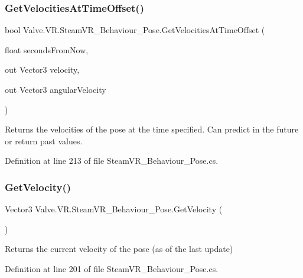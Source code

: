 \subsubsection{\texorpdfstring{GetVelocitiesAtTimeOffset()}{GetVelocitiesAtTimeOffset()}}
{\footnotesize\ttfamily bool Valve.\+V\+R.\+Steam\+V\+R\+\_\+\+Behaviour\+\_\+\+Pose.\+Get\+Velocities\+At\+Time\+Offset (\begin{DoxyParamCaption}\item[{float}]{seconds\+From\+Now,  }\item[{out Vector3}]{velocity,  }\item[{out Vector3}]{angular\+Velocity }\end{DoxyParamCaption})}



Returns the velocities of the pose at the time specified. Can predict in the future or return past values. 



Definition at line 213 of file Steam\+V\+R\+\_\+\+Behaviour\+\_\+\+Pose.\+cs.

\mbox{\label{class_valve_1_1_v_r_1_1_steam_v_r___behaviour___pose_ac36bf2a333805b149722844bf2994256}} 
\subsubsection{\texorpdfstring{GetVelocity()}{GetVelocity()}}
{\footnotesize\ttfamily Vector3 Valve.\+V\+R.\+Steam\+V\+R\+\_\+\+Behaviour\+\_\+\+Pose.\+Get\+Velocity (\begin{DoxyParamCaption}{ }\end{DoxyParamCaption})}



Returns the current velocity of the pose (as of the last update) 



Definition at line 201 of file Steam\+V\+R\+\_\+\+Behaviour\+\_\+\+Pose.\+cs.

\mbox{\label{class_valve_1_1_v_r_1_1_steam_v_r___behaviour___pose_a482f66677a5fba6e3f4f78540ea1c449}} 
